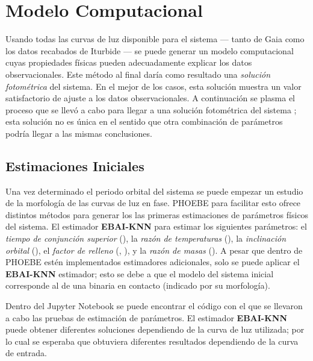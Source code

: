 \section{Modelo Computacional} \label{metodologia:modelocomputacional}

Usando todas las curvas de luz disponible para el sistema \atoObjId --- tanto de
Gaia como los datos recabados de Iturbide --- se puede generar un modelo
computacional cuyas propiedades físicas pueden adecuadamente explicar los datos
observacionales. Este método al final daría como resultado una \textit{solución
fotométrica} del sistema. En el mejor de los casos, esta solución muestra un
valor satisfactorio de ajuste a los datos observacionales. A continuación se
plasma el proceso que se llevó a cabo para llegar a una solución fotométrica del
sistema \atoObjIdNoSpace; esta solución no es única en el sentido que otra
combinación de parámetros podría llegar a las mismas conclusiones.

\subsection{Estimaciones Iniciales} \label{metodologia:modelocomputacional:estimacionesiniciales}

Una vez determinado el periodo orbital del sistema se puede empezar un estudio
de la morfología de las curvas de luz en fase. PHOEBE para facilitar esto ofrece
distintos métodos para generar los las primeras estimaciones de parámetros
físicos del sistema. El estimador \textbf{EBAI-KNN} para estimar los siguientes
parámetros: el \textit{tiempo de conjunción superior} (), la
\textit{razón de temperaturas} (), la \textit{inclinación
orbital} (), el \textit{factor de relleno}
(, ), y la \textit{razón
de masas} (). A pesar que dentro de PHOEBE estén implementados
estimadores adicionales, solo se puede aplicar el \textbf{EBAI-KNN} estimador;
esto se debe a que el modelo del sistema inicial corresponde al de una binaria
en contacto (indicado por su morfología).

Dentro del Jupyter Notebook
\href{https://github.com/KnightIV/UANL_MAPTA_PlanObservaciones/blob/main/analisis/phoebe_model/estimations/ebai-default.ipynb}{}
se puede encontrar el código con el que se llevaron a cabo las pruebas de
estimación de parámetros. El estimador \textbf{EBAI-KNN} puede obtener
diferentes soluciones dependiendo de la curva de luz utilizada; por lo cual se
esperaba que obtuviera diferentes resultados dependiendo de la curva de entrada.

